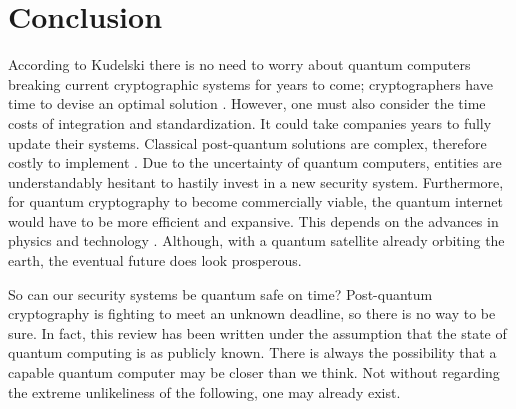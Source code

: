 \section{Conclusion}
According to Kudelski there is no need to worry about quantum computers breaking current cryptographic systems for years to come; cryptographers have time to devise an optimal solution \cite{Impact_QC_Cryptog}. However, one must also consider the time costs of integration and standardization. It could take companies years to fully update their systems. Classical post-quantum solutions are complex, therefore costly to implement \cite{Sec_Risk}. Due to the uncertainty of quantum computers, entities are understandably hesitant to hastily invest in a new security system. Furthermore, for quantum cryptography to become commercially viable, the quantum internet would have to be more efficient and expansive. This depends on the advances in physics and technology \cite{Q_Cryptog}. Although, with a quantum satellite already orbiting the earth, the eventual future does look prosperous.

So can our security systems be quantum safe on time? Post-quantum cryptography is fighting to meet an unknown deadline, so there is no way to be sure. In fact, this review has been written under the assumption that the state of quantum computing is as publicly known. There is always the possibility that a capable quantum computer may be closer than we think. Not without regarding the extreme unlikeliness of the following, one may already exist. 